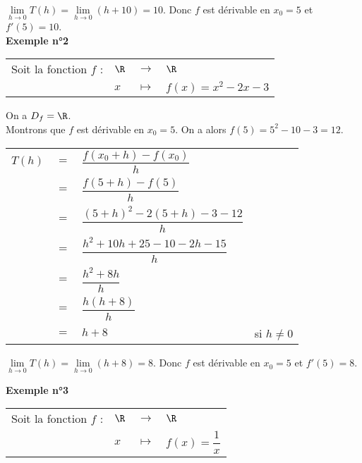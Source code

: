 $\lim\limits_{h \to 0} T(h) = \lim\limits_{h \to 0} (h + 10) = 10$. Donc $f$ est dérivable en $x_0 = 5$ et $f'(5) = 10$. \\

\textbf{Exemple n°2} \\

\begin{tabular}{llll}
Soit la fonction $f$ : & $\R$ & $\longrightarrow$ & $\R$ \\
& $x$ & $\longmapsto$ & $f\left(x\right) = x^2 - 2x - 3$ \\
\end{tabular}

On a $D_f = \R$. \\

Montrons que $f$ est dérivable en $x_0 = 5$. On a alors $f(5) = 5^2 - 10 - 3 = 12$. \\

\begin{tabular}{llll}
$T(h)$ & $=$ & $\dfrac{f(x_0 + h) - f(x_0)}{h}$ & \vspace*{.3cm} \\
& $=$ & $\dfrac{f(5 + h) - f(5)}{h}$ & \vspace*{.3cm} \\
& $=$ & $\dfrac{(5+h)^2 - 2\left(5+h\right) - 3 - 12}{h}$ & \vspace*{.3cm} \\
& $=$ & $\dfrac{h^2 + 10h + 25 -10 -2h - 15}{h}$ & \vspace*{.3cm} \\
& $=$ & $\dfrac{h^2 + 8h}{h}$ & \vspace*{.3cm} \\
& $=$ & $\dfrac{h\left(h+ 8\right)}{h}$ & \vspace*{.3cm} \\
& $=$ & $ h + 8$ & si $h \neq 0$ \vspace*{.3cm} \\
\end{tabular}

$\lim\limits_{h \to 0} T(h) = \lim\limits_{h \to 0} (h + 8) = 8$. Donc $f$ est dérivable en $x_0 = 5$ et $f'(5) = 8$. 

\newpage

\textbf{Exemple n°3} \\

\begin{tabular}{llll}
Soit la fonction $f$ : & $\R$ & $\longrightarrow$ & $\R$ \\
& $x$ & $\longmapsto$ & $f\left(x\right) = \dfrac{1}{x}$ \\
\end{tabular}

